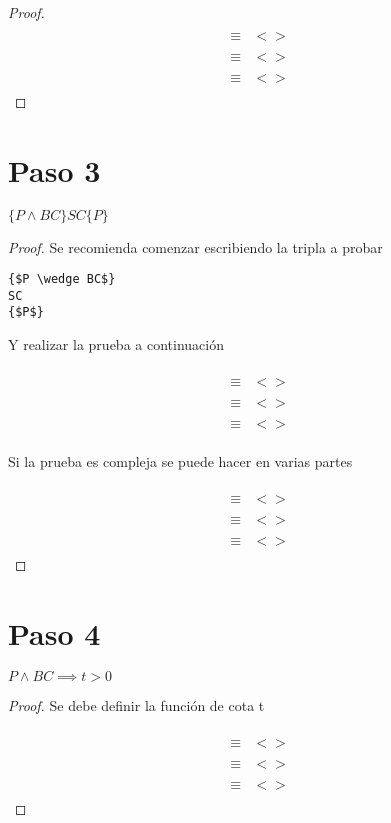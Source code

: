\documentclass[]{article}
\begin{document}
\begin{proof}
\begin{align*}
& \\
\equiv &<\text{}> \\
& \\
\equiv &<\text{}> \\
& \\
\equiv &<\text{}> \\
&
\end{align*}
\end{proof}


\section*{Paso 3}
$\{P \wedge BC\}SC\{P\}$ 
\begin{proof}

Se recomienda comenzar escribiendo la tripla a probar

\begin{lstlisting}[language=GCL, mathescape, tabsize=4]
{$P \wedge BC$}
SC
{$P$}
\end{lstlisting}

Y realizar la prueba a continuación

\begin{align*}
& \\
\equiv &<\text{}> \\
& \\
\equiv &<\text{}> \\
& \\
\equiv &<\text{}> \\
& 
\end{align*}

Si la prueba es compleja se puede hacer en varias partes

\begin{align*}
& \\
\equiv &<\text{}> \\
& \\
\equiv &<\text{}> \\
& \\
\equiv &<\text{}> \\
&
\end{align*}

\end{proof}

\section*{Paso 4}
$P \wedge BC \implies t>0$
\begin{proof}


Se debe definir la función de cota t

\begin{align*}
& \\
\equiv &<\text{}> \\
& \\
\equiv &<\text{}> \\
& \\
\equiv &<\text{}> \\
&
\end{align*}
\end{proof}
\end{document}
